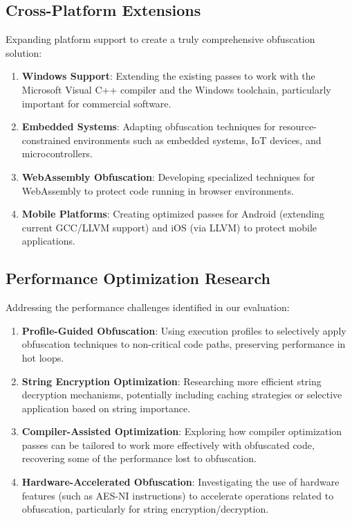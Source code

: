 \documentclass[conference]{IEEEtran}
\begin{document}
\subsection{Cross-Platform Extensions}

Expanding platform support to create a truly comprehensive obfuscation solution:

\begin{enumerate}
    \item \textbf{Windows Support}: Extending the existing passes to work with the Microsoft Visual C++ compiler and the Windows toolchain, particularly important for commercial software.
    
    \item \textbf{Embedded Systems}: Adapting obfuscation techniques for resource-constrained environments such as embedded systems, IoT devices, and microcontrollers.
    
    \item \textbf{WebAssembly Obfuscation}: Developing specialized techniques for WebAssembly to protect code running in browser environments.
    
    \item \textbf{Mobile Platforms}: Creating optimized passes for Android (extending current GCC/LLVM support) and iOS (via LLVM) to protect mobile applications.
\end{enumerate}

\subsection{Performance Optimization Research}

Addressing the performance challenges identified in our evaluation:

\begin{enumerate}
    \item \textbf{Profile-Guided Obfuscation}: Using execution profiles to selectively apply obfuscation techniques to non-critical code paths, preserving performance in hot loops.
    
    \item \textbf{String Encryption Optimization}: Researching more efficient string decryption mechanisms, potentially including caching strategies or selective application based on string importance.
    
    \item \textbf{Compiler-Assisted Optimization}: Exploring how compiler optimization passes can be tailored to work more effectively with obfuscated code, recovering some of the performance lost to obfuscation.
    
    \item \textbf{Hardware-Accelerated Obfuscation}: Investigating the use of hardware features (such as AES-NI instructions) to accelerate operations related to obfuscation, particularly for string encryption/decryption.
\end{enumerate}
\end{document}
